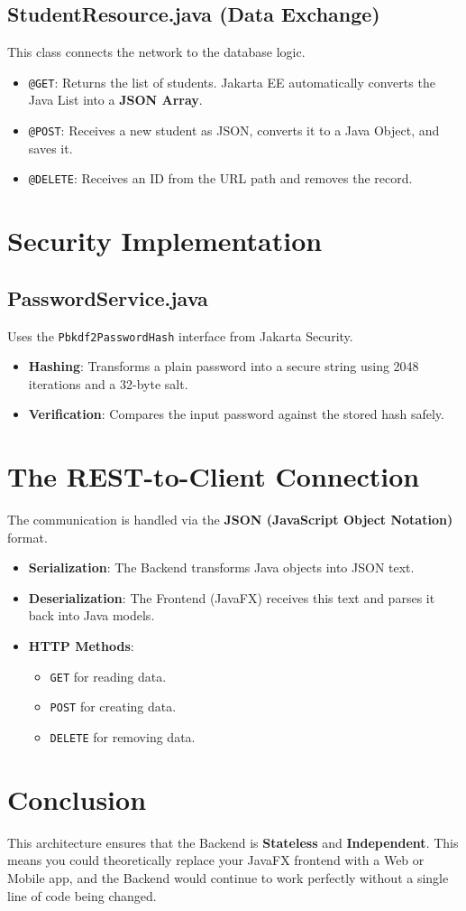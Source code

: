 \documentclass[12pt,a4paper]{article}
\begin{document}
\subsection{StudentResource.java (Data Exchange)}
This class connects the network to the database logic.
\begin{itemize}
    \item \texttt{@GET}: Returns the list of students. Jakarta EE automatically converts the Java List into a \textbf{JSON Array}.
    \item \texttt{@POST}: Receives a new student as JSON, converts it to a Java Object, and saves it.
    \item \texttt{@DELETE}: Receives an ID from the URL path and removes the record.
\end{itemize}

\section{Security Implementation}

\subsection{PasswordService.java}
Uses the \texttt{Pbkdf2PasswordHash} interface from Jakarta Security.
\begin{itemize}
    \item \textbf{Hashing}: Transforms a plain password into a secure string using 2048 iterations and a 32-byte salt.
    \item \textbf{Verification}: Compares the input password against the stored hash safely.
\end{itemize}

\section{The REST-to-Client Connection}
The communication is handled via the \textbf{JSON (JavaScript Object Notation)} format.
\begin{itemize}
    \item \textbf{Serialization}: The Backend transforms Java objects into JSON text.
    \item \textbf{Deserialization}: The Frontend (JavaFX) receives this text and parses it back into Java models.
    \item \textbf{HTTP Methods}: 
    \begin{itemize}
        \item \texttt{GET} for reading data.
        \item \texttt{POST} for creating data.
        \item \texttt{DELETE} for removing data.
    \end{itemize}
\end{itemize}

\section{Conclusion}
This architecture ensures that the Backend is \textbf{Stateless} and \textbf{Independent}. This means you could theoretically replace your JavaFX frontend with a Web or Mobile app, and the Backend would continue to work perfectly without a single line of code being changed.
\end{document}
